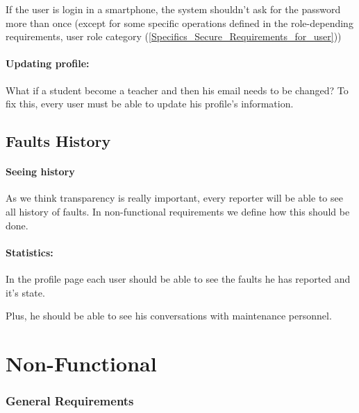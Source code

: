If the user is login in a smartphone, the system shouldn't ask for the password more than once (except for some specific operations defined in the role-depending requirements, user role category (\ref{Specifics_Secure_Requirements_for_user}))

\paragraph{Updating profile: } What if a student become a teacher and then his email needs to be changed? To fix this, every user must be able to update his profile's information. 


\subsection{Faults History}

\paragraph{Seeing history} As we think transparency is really important, every reporter will be able to see all history of faults. In non-functional requirements we define how this should be done. 

\paragraph{Statistics: } In the profile page each user should be able to see the faults he has reported and it's state.

Plus, he should be able to see his conversations with maintenance personnel.


\section{Non-Functional}

\subsubsection{General Requirements}


